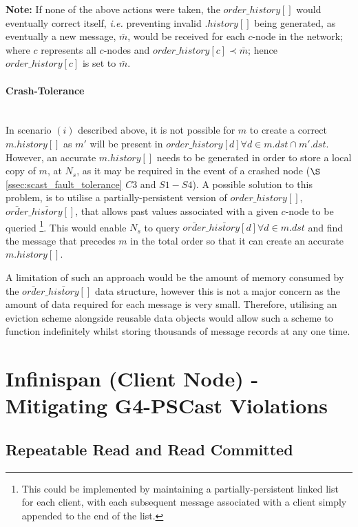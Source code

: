     \textbf{Note: } If none of the above actions were taken, the $order\_history[]$ would eventually correct itself, \emph{i.e.} preventing invalid $.history[]$ being generated, as eventually a new message, $\bar{m}$, would be received for each $c$-node in the network; where $c$ represents all $c$-nodes and $order\_history[c] \prec \bar{m}$; hence $order\_history[c]$ is set to $\bar{m}$.  
    
    \paragraph{Crash-Tolerance} \hfill \\
    In scenario $(i)$ described above, it is not possible for $m$ to create a correct $m.history[]$ as $m'$ will be present in $order\_history[d] \forall d \in m.dst \cap m'.dst$.  However, an accurate $m.history[]$ needs to be generated in order to store a local copy of $m$, at $N_s$, as it may be required in the event of a crashed node ($\S$ \ref{ssec:scast_fault_tolerance} $C3$ and $S1-S4$).  A possible solution to this problem, is to utilise a partially-persistent version of $order\_history[]$, $\bar{order}\_\bar{history}[]$, that allows past values associated with a given $c$-node to be queried \footnote{This could be implemented by maintaining a partially-persistent linked list for each client, with each subsequent message associated with a client simply appended to the end of the list.}.  This would enable $N_s$ to query $\bar{order}\_\bar{history}[d] \forall d \in m.dst$ and find the message that precedes $m$ in the total order so that it can create an accurate $m.history[]$.
    
    A limitation of such an approach would be the amount of memory consumed by the $\bar{order}\_\bar{history}[]$ data structure, however this is not a major concern as the amount of data required for each message is very small.  Therefore, utilising an eviction scheme alongside reusable data objects would allow such a scheme to function indefinitely whilst storing thousands of message records at any one time.  

\section{Infinispan (Client Node) - Mitigating G4-PSCast Violations}

    \subsection{Repeatable Read and Read Committed}
    
